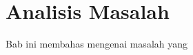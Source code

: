 \chapter{Analisis Masalah}
\label{chap:analisis-masalah}
Bab ini membahas mengenai masalah yang 





